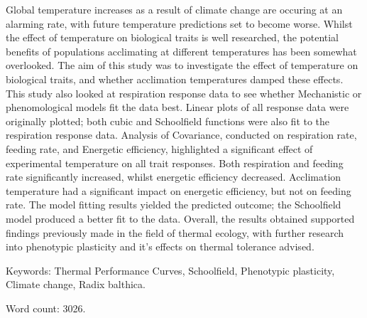 \documentclass[../../Paper.tex]{subfiles}
\begin{document}
Global temperature increases as a result of climate change are occuring 
at an alarming rate, with future temperature predictions set
to become worse. Whilst the effect of temperature on biological
traits is well researched, the potential benefits of populations acclimating at different temperatures 
has been somewhat overlooked. The aim of this study was
to investigate the effect of temperature on biological traits,
and whether acclimation temperatures damped these effects.
This study also looked at respiration response data to see whether Mechanistic or
phenomological models fit the data best. Linear plots of all 
response data were originally plotted; both cubic and Schoolfield
functions were also fit to the respiration response
data. Analysis of Covariance, conducted on respiration rate, feeding rate, and
Energetic efficiency, highlighted a significant effect of experimental temperature
on all trait responses. Both respiration and feeding rate significantly increased, whilst energetic efficiency
decreased. Acclimation temperature had a significant impact on energetic efficiency, 
but not on feeding rate. The model fitting results yielded the predicted outcome; 
the Schoolfield model produced a better fit to the data. Overall, the results
obtained supported findings previously made in the field of thermal
ecology, with further research into phenotypic plasticity and it's effects on thermal
tolerance advised.
\vspace{1cm}

Keywords: Thermal Performance Curves, Schoolfield, Phenotypic plasticity, Climate change, Radix balthica. 


\vspace{3cm}
Word count: 3026. 
\newpage
\end{document}
